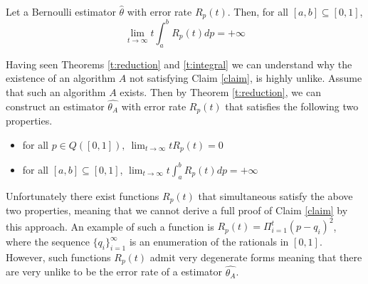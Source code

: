 \begin{theorem}\label{t:integral}
Let a Bernoulli estimator $\hat{\theta}$ with error rate $R_p(t)$. Then, for all $[a,b] \subseteq [0,1]$,
\[ \lim_{t \to \infty}t \int_{a}^{b}R_p(t)dp = +\infty\]
\end{theorem} 

\noindent Having seen Theorems \ref{t:reduction} and \ref{t:integral} we can understand why the existence of an algorithm $A$ not satisfying Claim \ref{claim},
is highly unlike. Assume that such an algorithm $A$ exists. Then by Theorem \ref{t:reduction}, we can construct an estimator $\hat{\theta_A}$ with
error rate $R_p(t)$ that satisfies the following two properties.

\begin{itemize}
 \item for all $p \in Q([0,1]),~ \lim_{t \rightarrow \infty}tR_p(t)=0$
 \item for all $[a,b] \subseteq [0,1]$, $\lim_{t \to \infty}t \int_{a}^{b}R_p(t)dp = +\infty$
\end{itemize}

\noindent Unfortunately there exist functions $R_p(t)$ that simultaneous satisfy the above two properties, meaning that we cannot derive a full proof of 
Claim \ref{claim} by this approach. An example of such a function is $R_p(t)=\Pi_{i=1}^t(p-q_i)^2$, where the sequence $\{q_i\}_{i=1}^{\infty}$ is 
an enumeration of the rationals in $[0,1]$. However, such functions $R_p(t)$ admit very degenerate forms meaning that there are very unlike 
to be the error rate of a estimator $\hat{\theta_A}$. 



